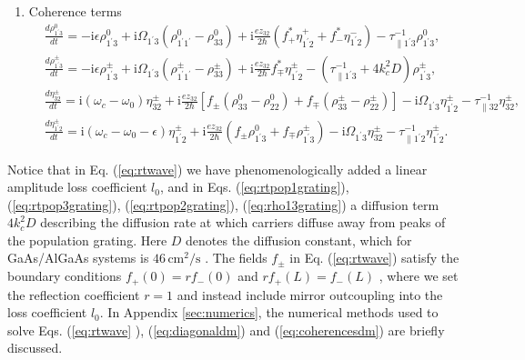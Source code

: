 \documentclass[10pt,letterpaper]{article}%
\begin{document}
\begin{enumerate}
\item {Coherence terms%
\begin{subequations}%
\label{eq:coherencesdm}
\begin{align}
&  \frac{d\rho_{1^{\prime}3}^{0}}{dt}=-\mathrm{i}\epsilon\rho_{1^{\prime}%
3}^{0}+\mathrm{i}\Omega_{1^{\prime}3}\left(  \rho_{1^{\prime}1^{\prime}}%
^{0}-\rho_{33}^{0}\right)  +\mathrm{i}\frac{ez_{32}}{2\hbar}\left(
f_{+}^{\ast}\eta_{1^{\prime}2}^{+}+f_{-}^{\ast}\eta_{1^{\prime}2}^{-}\right)
-\tau_{\parallel1^{\prime}3}^{-1}\rho_{1^{\prime}3}^{0},\\
&  \frac{d\rho_{1^{\prime}3}^{\pm}}{dt}=-\mathrm{i}\epsilon\rho_{1^{\prime}%
3}^{\pm}+\mathrm{i}\Omega_{1^{\prime}3}\left(  \rho_{1^{\prime}1^{\prime}%
}^{\pm}-\rho_{33}^{\pm}\right)  +\mathrm{i}\frac{ez_{32}}{2\hbar}f_{\mp}%
^{\ast}\eta_{1^{\prime}2}^{\pm}-\left(  \tau_{\parallel1^{\prime}3}%
^{-1}+4k_{c}^{2}D\right)  \rho_{1^{\prime}3}^{\pm},\label{eq:rho13grating}\\
&  \frac{d\eta_{32}^{\pm}}{dt}=\mathrm{i}\left(  \omega_{c}-\omega_{0}\right)
\eta_{32}^{\pm}+\mathrm{i}\frac{ez_{32}}{2\hbar}\left[  f_{\pm}(\rho_{33}%
^{0}-\rho_{22}^{0})+f_{\mp}(\rho_{33}^{\pm}-\rho_{22}^{\pm})\right]
-\mathrm{i}\Omega_{1^{\prime}3}\eta_{1^{\prime}2}^{\pm}-\tau_{\parallel
32}^{-1}\eta_{32}^{\pm},\\
&  \frac{d\eta_{1^{\prime}2}^{\pm}}{dt}=\mathrm{i}\left(  \omega_{c}%
-\omega_{0}-\epsilon\right)  \eta_{1^{\prime}2}^{\pm}+\mathrm{i}\frac{ez_{32}%
}{2\hbar}\left(  f_{\pm}\rho_{1^{\prime}3}^{0}+f_{\mp}\rho_{1^{\prime}3}^{\pm
}\right)  -\mathrm{i}\Omega_{1^{\prime}3}\eta_{32}^{\pm}-\tau_{\parallel
1^{\prime}2}^{-1}\eta_{1^{\prime}2}^{\pm}. \label{eq:rho12-dm}%
\end{align}%
\end{subequations}%
}
\end{enumerate}

Notice that in Eq. (\ref{eq:rtwave}) we have phenomenologically added a linear
amplitude loss coefficient $l_{0}$, and in Eqs. (\ref{eq:rtpop1grating}),
(\ref{eq:rtpop3grating}), ({\ref{eq:rtpop2grating}), (\ref{eq:rho13grating}) a
diffusion term $4k_{c}^{2}D$ describing the diffusion rate at which carriers
diffuse away from peaks of the population grating. Here $D$ denotes the
diffusion constant, which for GaAs/AlGaAs systems is }${46\,\mathrm{cm}^{2}%
/}\mathrm{s}${ \cite{wang2009mode,vukovic2016multimode}. }
The fields $f_{\pm }$ in Eq. (\ref{eq:rtwave}) satisfy the boundary conditions
$f_{+}\left( 0\right) =rf_{-}\left( 0\right) $ and
$rf_{+}\left( L\right) =f_{-}\left( L\right) $ \cite{wang2007coherent},
where we set the reflection coefficient $r=1$ and instead include mirror outcoupling
into the loss coefficient $l_{0}$. In Appendix
\ref{sec:numerics}, the numerical methods used to solve Eqs. (\ref{eq:rtwave}%
), (\ref{eq:diagonaldm}) and (\ref{eq:coherencesdm}) are briefly discussed.
\end{document}
